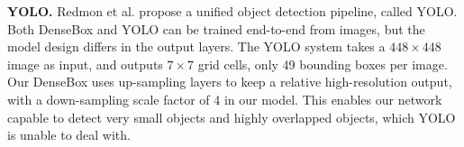 \textbf{YOLO.}  Redmon et al.\cite{YOLO} propose a unified object detection pipeline, called YOLO. Both DenseBox and YOLO can be trained end-to-end from images, but the model design differs in the output layers.  The YOLO system takes a $448 \times 448$ image as input, and outputs $7 \times 7$ grid cells, only 49 bounding boxes per image. Our DenseBox uses up-sampling layers to keep a relative high-resolution output, with a down-sampling scale factor of 4 in our model. This enables our network capable to detect very small objects and highly overlapped objects, which YOLO is unable to deal with. 
 

